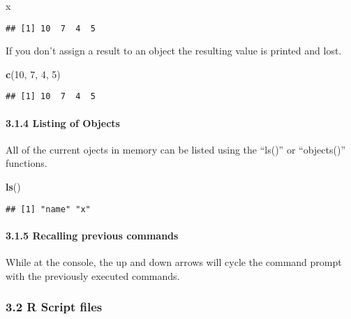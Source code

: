 \documentclass[]{article}
\newenvironment{Shaded}{}{}
\newcommand{\KeywordTok}[1]{\textcolor[rgb]{0.00,0.44,0.13}{\textbf{{#1}}}}
\newcommand{\DecValTok}[1]{\textcolor[rgb]{0.25,0.63,0.44}{{#1}}}
\newcommand{\NormalTok}[1]{{#1}}
\begin{document}
\begin{Shaded}
\begin{Highlighting}[]
\NormalTok{x}
\end{Highlighting}
\end{Shaded}

\begin{verbatim}
## [1] 10  7  4  5
\end{verbatim}

If you don't assign a result to an object the resulting value is printed
and lost.

\begin{Shaded}
\begin{Highlighting}[]
\KeywordTok{c}\NormalTok{(}\DecValTok{10}\NormalTok{, }\DecValTok{7}\NormalTok{, }\DecValTok{4}\NormalTok{, }\DecValTok{5}\NormalTok{)}
\end{Highlighting}
\end{Shaded}

\begin{verbatim}
## [1] 10  7  4  5
\end{verbatim}

\paragraph{3.1.4 Listing of Objects}

All of the current ojects in memory can be listed using the ``ls()'' or
``objects()'' functions.

\begin{Shaded}
\begin{Highlighting}[]
\KeywordTok{ls}\NormalTok{()}
\end{Highlighting}
\end{Shaded}

\begin{verbatim}
## [1] "name" "x"
\end{verbatim}

\paragraph{3.1.5 Recalling previous commands}

While at the console, the up and down arrows will cycle the command
prompt with the previously executed commands.

\subsubsection{3.2 R Script files}
\end{document}
